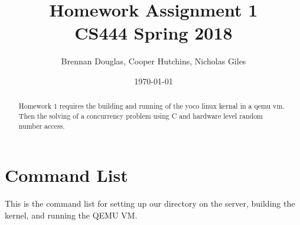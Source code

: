 \documentclass[onecolumn, draftclsnofoot,10pt, compsoc]{IEEEtran}
\title{Homework Assignment 1\\\large CS444 Spring 2018}
\author{Brennan Douglas, Cooper Hutchins, Nicholas Giles}
\date{\today}
\begin{document}
\begin{titlingpage}
			\maketitle
      \begin{abstract}
			\noindent Homework 1 requires the building and running of the yoco linux kernal in a qemu vm.  Then the solving of a concurrency problem using C and hardware level random number access.
      \end{abstract}
\end{titlingpage}

\newpage
{}

\clearpage
\singlespace



\section{Command List}

This is the command list for setting up our directory on the server, building the kernel, and running the QEMU VM.
\end{document}
